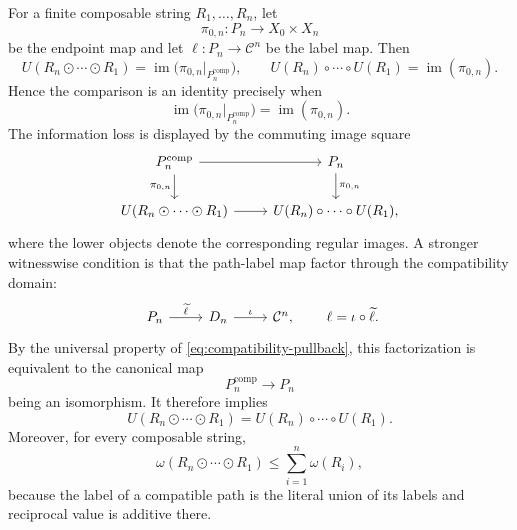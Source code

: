 For a finite composable string $R_1,\ldots,R_n$, let
\[
\pi_{0,n}:P_n\longrightarrow X_0\times X_n
\]
be the endpoint map and let $\ell:P_n\to\mathcal C^n$ be the label map.  Then
\begin{equation}\label{eq:strictness-endpoint-images}
U(R_n\odot\cdots\odot R_1)
=\operatorname{im}\bigl(\pi_{0,n}|_{P_n^{\mathrm{comp}}}\bigr),
\qquad
U(R_n)\circ\cdots\circ U(R_1)
=\operatorname{im}(\pi_{0,n}).
\end{equation}
Hence the comparison is an identity precisely when
\begin{equation}\label{eq:strictness-endpoint-criterion}
\operatorname{im}\bigl(\pi_{0,n}|_{P_n^{\mathrm{comp}}}\bigr)
=
\operatorname{im}(\pi_{0,n}).
\end{equation}
The information loss is displayed by the commuting image square
\begin{equation}\label{eq:strictness-information-square}
\begin{tikzcd}
P_n^{\mathrm{comp}} \arrow[r] \arrow[d,"{\pi_{0,n}}"']
  & P_n \arrow[d,"{\pi_{0,n}}"]\\
U(R_n\odot\cdots\odot R_1) \arrow[r]
  & U(R_n)\circ\cdots\circ U(R_1),
\end{tikzcd}
\end{equation}
where the lower objects denote the corresponding regular images.  A stronger witnesswise condition is that the path-label map factor through the compatibility domain:
\begin{equation}\label{eq:compatibility-factorization}
\begin{tikzcd}
P_n \arrow[r,"{\widetilde\ell}"] & D_n \arrow[r,"{\iota}"] & \mathcal C^n,
\end{tikzcd}
\qquad
\ell=\iota\circ\widetilde\ell.
\end{equation}
By the universal property of \eqref{eq:compatibility-pullback}, this factorization is equivalent to the canonical map
\[
P_n^{\mathrm{comp}}\longrightarrow P_n
\]
being an isomorphism.  It therefore implies
\begin{equation}\label{eq:rel-strictification}
U(R_n\odot\cdots\odot R_1)
=
U(R_n)\circ\cdots\circ U(R_1).
\end{equation}
Moreover, for every composable string,
\begin{equation}\label{eq:mass-subadditive}
\omega(R_n\odot\cdots\odot R_1)
\le\sum_{i=1}^n\omega(R_i),
\end{equation}
because the label of a compatible path is the literal union of its labels and reciprocal value is additive there.

